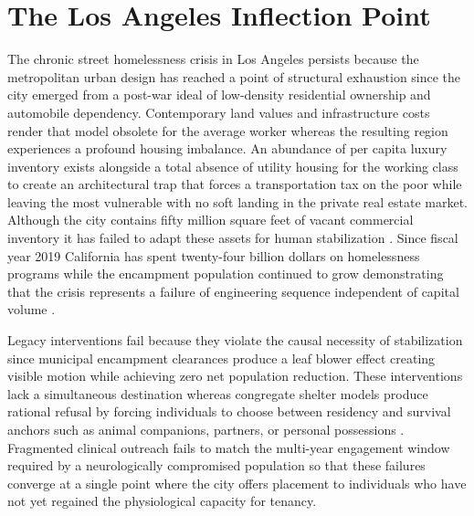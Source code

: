 \documentclass[12pt, letterpaper]{article}
\begin{document}
\newpage
\begingroup
{}
\setlength{\cftbeforesecskip}{2pt}
\setlength{\cftbeforesubsecskip}{-2pt}
\tableofcontents
\endgroup


\clearpage
\section{The Los Angeles Inflection Point}

The chronic street homelessness crisis in Los Angeles persists because the metropolitan urban design has reached a point of structural exhaustion since the city emerged from a post-war ideal of low-density residential ownership and automobile dependency. Contemporary land values and infrastructure costs render that model obsolete for the average worker whereas the resulting region experiences a profound housing imbalance. An abundance of per capita luxury inventory exists alongside a total absence of utility housing for the working class to create an architectural trap that forces a transportation tax on the poor while leaving the most vulnerable with no soft landing in the private real estate market. Although the city contains fifty million square feet of vacant commercial inventory it has failed to adapt these assets for human stabilization \citep{globest_2025}. Since fiscal year 2019 California has spent twenty-four billion dollars on homelessness programs while the encampment population continued to grow demonstrating that the crisis represents a failure of engineering sequence independent of capital volume \citep{ca_24b_expenditure_2024, lahsa_count_2025}.

Legacy interventions fail because they violate the causal necessity of stabilization since municipal encampment clearances produce a leaf blower effect creating visible motion while achieving zero net population reduction. These interventions lack a simultaneous destination whereas congregate shelter models produce rational refusal by forcing individuals to choose between residency and survival anchors such as animal companions, partners, or personal possessions \citep{usda_pet_barriers_2023, hud_shelter_barriers_2022}. Fragmented clinical outreach fails to match the multi-year engagement window required by a neurologically compromised population so that these failures converge at a single point where the city offers placement to individuals who have not yet regained the physiological capacity for tenancy.
\end{document}

